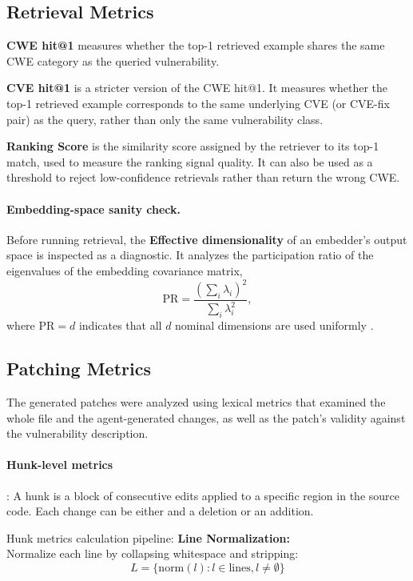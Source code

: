 \subsection{Retrieval Metrics}
\textbf{CWE hit@1} measures whether the top-1 retrieved example shares the same CWE category as the queried vulnerability.

\textbf{CVE hit@1} is a stricter version of the CWE hit@1. It measures whether the top-1 retrieved example corresponds to the same underlying CVE (or CVE-fix pair) as the query, rather than only the same vulnerability class.

\textbf{Ranking Score} is the similarity score assigned by the retriever to its top-1 match, used to measure the ranking signal quality. It can also be used as a threshold to reject low-confidence retrievals rather than return the wrong CWE.


\paragraph{Embedding-space sanity check.} Before running retrieval, the \textbf{Effective dimensionality} of an embedder's output space is inspected as a diagnostic. It analyzes the participation ratio of the eigenvalues of the embedding covariance matrix,
\[
\text{PR} = \frac{\left(\sum_i \lambda_i\right)^2}{\sum_i \lambda_i^2},
\]
where $\text{PR}=d$ indicates that all $d$ nominal dimensions are used uniformly \cite{ansuini2019intrinsic}. 

\subsection{Patching Metrics}
The generated patches were analyzed using lexical metrics that examined the whole file and the agent-generated changes, as well as the patch's validity against the vulnerability description.

\paragraph{Hunk-level metrics}: A hunk is a block of consecutive edits applied to a specific region in the source code\cite{nashid2025characterizingmultihunkpatchesdivergence}. 
Each change can be either and a deletion or an addition.

Hunk metrics calculation pipeline:
\noindent \textbf{Line Normalization:} \\
Normalize each line by collapsing whitespace and stripping:
\[
L = \{\text{norm}(l) : l \in \text{lines}, l \neq \emptyset\}
\]

